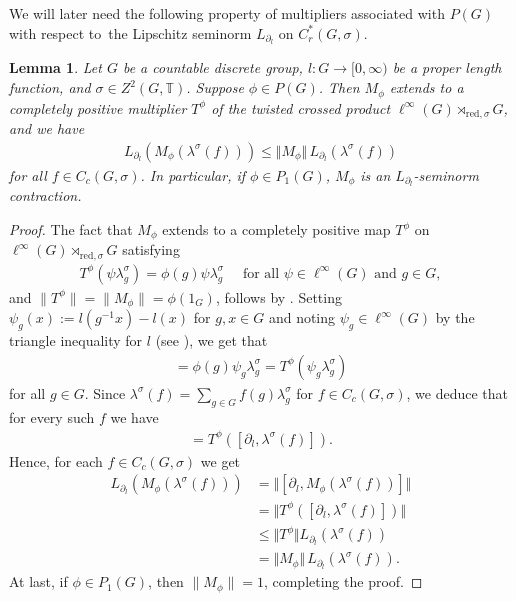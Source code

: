 \documentclass[11pt, a4paper, oneside, final, reqno]{amsart}
\newcommand{\bbT}{\mathbb{T}}
\newcommand{\Cred}{C^*_r}
\theoremstyle{definition}
\theoremstyle{plain}
\newtheorem{lemma}[definition]{Lemma}
\theoremstyle{remark}
\numberwithin{equation}{section}
\begin{document}
We will later need the following property of multipliers associated with $P(G)$ with respect to~the Lipschitz seminorm  $L_{\partial_l}$ on $\Cred(G,\sigma)$.
\begin{lemma}\label{lemma:L-cont-multipliers}
    Let $G$ be a countable discrete group, $l \colon G \to [0,\infty)$ be a proper length function, and $\sigma \in Z^2(G,\bbT)$. Suppose $\phi \in P(G)$. Then $M_\phi$ extends to a completely positive multiplier $T^\phi$ of the twisted crossed product $ \ell^\infty(G) \rtimes_{\mathrm{red}, \sigma} G$, and we have
    \begin{align*}
        L_{\partial_l}(M_\phi (\lambda^\sigma(f))) \leq \Vert M_\phi \Vert \, L_{\partial_l}(\lambda^\sigma(f))
    \end{align*}
    for all $f \in C_c(G, \sigma)$. In particular, if $\phi \in P_1(G)$, $M_\phi$ is an $L_{\partial_l}$-seminorm contraction.
\end{lemma}
\begin{proof}
    The fact that $M_\phi$ extends to a completely positive map $T^\phi$ on $\ell^\infty(G) \rtimes_{\mathrm{red}, \sigma} G$ satisfying
    \begin{align}\label{eq:action-T-phi}
    T^\phi(\psi\lambda^\sigma_g) = \phi(g)\psi\lambda^\sigma_g \quad \text{ for all } \psi \in \ell^\infty(G)  \text{ and } g\in G,
    \end{align}
    and $\|T^\phi\| = \|M_\phi\| = \phi(1_G)$,
    follows by \cite[Corollary 4.3]{BedosConti2015}. Setting $\psi_g (x):= l(g^{-1}x) - l(x)$ for $g, x \in G$ and noting $\psi_g \in \ell^\infty(G)$ by the triangle inequality for $l$ (see \cite[Lemma 5]{Connes1989}), we get that
    \begin{align*}
        [\partial_l, M_\phi(\lambda^\sigma_g)] = \phi(g) \psi_g  \lambda^{\sigma}_g = T^{\phi} (\psi_g \lambda^\sigma_g)
    \end{align*}
    for all $g \in G$. Since $\lambda^\sigma(f) = \sum_{g\in G} f(g) \lambda^\sigma_g$ for $f \in C_c(G, \sigma)$, we deduce that for every such $f$ we have
    \begin{align*}
        [\partial_l, M_\phi(\lambda^\sigma(f))] = T^\phi([\partial_l, \lambda^\sigma(f)]) .
    \end{align*}
    Hence, for each $f \in C_c(G, \sigma)$ we get
    \begin{align*}
        L_{\partial_l}(M_\phi (\lambda^\sigma(f)))
        & = \Vert [\partial_l, M_\phi(\lambda^\sigma(f))] \Vert \\
        & = \Vert T^\phi ([\partial_l, \lambda^\sigma(f)]) \Vert \\
        & \leq \Vert T^\phi \Vert L_{\partial_l}(\lambda^\sigma(f)) \\
        & = \Vert M_\phi \Vert \, L_{\partial_l}(\lambda^\sigma(f)).
    \end{align*}
    At last, if $\phi \in P_1(G)$, then $\|M_\phi\| = 1$, completing the proof.
\end{proof}
\end{document}
